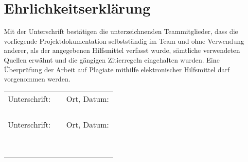 \section{Ehrlichkeitserklärung}\label{sec:Ehrlichkeitserklärung}
Mit der Unterschrift bestätigen die unterzeichnenden Teammitglieder, dass die vorliegende Projektdokumentation selbstständig im Team und ohne Verwendung anderer, als der angegebenen Hilfsmittel verfasst wurde, sämtliche verwendeten Quellen erwähnt und die gängigen Zitierregeln eingehalten wurden. Eine Überprüfung der Arbeit auf Plagiate mithilfe elektronischer Hilfsmittel darf vorgenommen werden.


\vspace{20mm}


\begin{center}
		\renewcommand{\arraystretch}{1}
	\begin{tabular}{lp{5em}l} 
  
		
		Unterschrift:   && Ort, Datum: \\
		&&\\
		\hspace{5cm}   && \hspace{5cm} \\\cline{1-1}\cline{3-3}
		&&\\
		&&\\
		Unterschrift:   && Ort, Datum: \\
		&&\\
		\hspace{5cm}   && \hspace{5cm} \\\cline{1-1}\cline{3-3}
		&&\\
		&&\\

  
  \ \\
 \end{tabular}
 \end{center}




